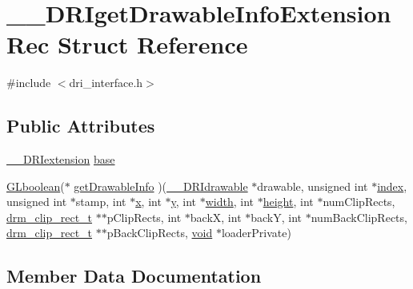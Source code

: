 \hypertarget{struct_____d_r_iget_drawable_info_extension_rec}{}\section{\+\_\+\+\_\+\+D\+R\+Iget\+Drawable\+Info\+Extension\+Rec Struct Reference}
\label{struct_____d_r_iget_drawable_info_extension_rec}


{\ttfamily \#include $<$dri\+\_\+interface.\+h$>$}

\subsection*{Public Attributes}
\begin{DoxyCompactItemize}
\item 
\hyperlink{dri__interface_8h_a4e0a61c8ece00d2b2c6792a9a1b55385}{\+\_\+\+\_\+\+D\+R\+Iextension} \hyperlink{struct_____d_r_iget_drawable_info_extension_rec_a11af234206e5eb72327421399c8adb7a}{base}
\item 
\hyperlink{gl_8h_aea1419aa8aec5854bd9807b45171029d}{G\+Lboolean}($\ast$ \hyperlink{struct_____d_r_iget_drawable_info_extension_rec_a891881ca6122407756c37d8ac5f8075c}{get\+Drawable\+Info} )(\hyperlink{dri__interface_8h_a5bfb832a0a08208d95b3bbef439d2262}{\+\_\+\+\_\+\+D\+R\+Idrawable} $\ast$drawable, unsigned int $\ast$\hyperlink{glcorearb_8h_a57f14e05b1900f16a2da82ade47d0c6d}{index}, unsigned int $\ast$stamp, int $\ast$\hyperlink{gl_8h_ad0e63d0edcdbd3d79554076bf309fd47}{x}, int $\ast$\hyperlink{gl_8h_a1675d9d7bb68e1657ff028643b4037e3}{y}, int $\ast$\hyperlink{gl_8h_a9a82cf3caff84cabc4598e2619faac17}{width}, int $\ast$\hyperlink{gl_8h_aa352f2804b9902ac30769c00dde75d5f}{height}, int $\ast$num\+Clip\+Rects, \hyperlink{dri__interface_8h_a912a372f2417e4f139f82bbf0a3d4fc1}{drm\+\_\+clip\+\_\+rect\+\_\+t} $\ast$$\ast$p\+Clip\+Rects, int $\ast$backX, int $\ast$backY, int $\ast$num\+Back\+Clip\+Rects, \hyperlink{dri__interface_8h_a912a372f2417e4f139f82bbf0a3d4fc1}{drm\+\_\+clip\+\_\+rect\+\_\+t} $\ast$$\ast$p\+Back\+Clip\+Rects, \hyperlink{_s_d_l__opengles2__gl2ext_8h_ae5d8fa23ad07c48bb609509eae494c95}{void} $\ast$loader\+Private)
\end{DoxyCompactItemize}


\subsection{Member Data Documentation}
\mbox{\label{struct_____d_r_iget_drawable_info_extension_rec_a11af234206e5eb72327421399c8adb7a}} 

